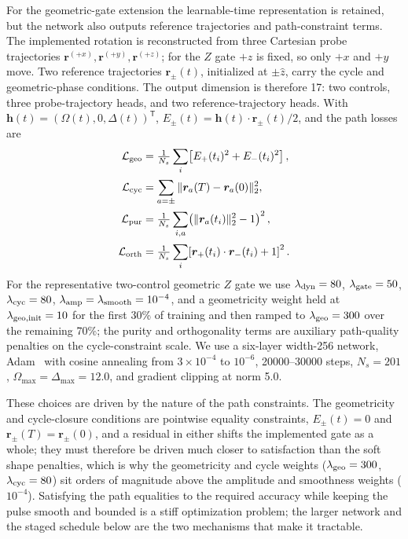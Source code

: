 \documentclass[aps,prx,reprint,superscriptaddress,nofootinbib,longbibliography,floatfix,showkeys]{revtex4-2}
\newcommand{\rr}{\bm r}
\begin{document}
For the geometric-gate extension the learnable-time representation is retained, but the network also outputs reference trajectories and path-constraint terms.  The implemented rotation is reconstructed from three Cartesian probe trajectories $\rr^{(+x)},\rr^{(+y)},\rr^{(+z)}$; for the $Z$ gate $+z$ is fixed, so only $+x$ and $+y$ move.  Two reference trajectories $\rr_\pm(t)$, initialized at $\pm\hat z$, carry the cycle and geometric-phase conditions.  The output dimension is therefore 17: two controls, three probe-trajectory heads, and two reference-trajectory heads.  With $\bm h(t)=(\Omega(t),0,\Delta(t))^{\mathsf T}$, $E_\pm(t)=\bm h(t)\cdot\rr_\pm(t)/2$, and the path losses are
\begin{equation}
\begin{aligned}
    \mathcal L_{\rm geo}&=\tfrac{1}{N_s}\sum_i\!\left[E_+(t_i)^2+E_-(t_i)^2\right],\\[1pt]
    \mathcal L_{\rm cyc}&=\sum_{a=\pm}\|\rr_a(T)-\rr_a(0)\|_2^2,\\[1pt]
    \mathcal L_{\rm pur}&=\tfrac{1}{N_s}\sum_{i,a}\!\left(\|\rr_a(t_i)\|_2^2-1\right)^2,\\[1pt]
    \mathcal L_{\rm orth}&=\tfrac{1}{N_s}\sum_i\!\left[\rr_+(t_i)\cdot\rr_-(t_i)+1\right]^2.
\end{aligned}
\end{equation}
For the representative two-control geometric $Z$ gate we use $\lambda_{\rm dyn}=80$, $\lambda_{\rm gate}=50$, $\lambda_{\rm cyc}=80$, $\lambda_{\rm amp}=\lambda_{\rm smooth}=10^{-4}$, and a geometricity weight held at $\lambda_{\rm geo,init}=10$ for the first 30\% of training and then ramped to $\lambda_{\rm geo}=300$ over the remaining 70\%; the purity and orthogonality terms are auxiliary path-quality penalties on the cycle-constraint scale.  We use a six-layer width-256 network, Adam~\cite{Kingma2015Adam} with cosine annealing from $3\times10^{-4}$ to $10^{-6}$, 20000--30000 steps, $N_s=201$, $\Omega_{\max}=\Delta_{\max}=12.0$, and gradient clipping at norm 5.0.

These choices are driven by the nature of the path constraints.  The geometricity and cycle-closure conditions are pointwise equality constraints, $E_\pm(t)=0$ and $\rr_\pm(T)=\rr_\pm(0)$, and a residual in either shifts the implemented gate as a whole; they must therefore be driven much closer to satisfaction than the soft shape penalties, which is why the geometricity and cycle weights ($\lambda_{\rm geo}=300$, $\lambda_{\rm cyc}=80$) sit orders of magnitude above the amplitude and smoothness weights ($10^{-4}$).  Satisfying the path equalities to the required accuracy while keeping the pulse smooth and bounded is a stiff optimization problem; the larger network and the staged schedule below are the two mechanisms that make it tractable.
\end{document}
